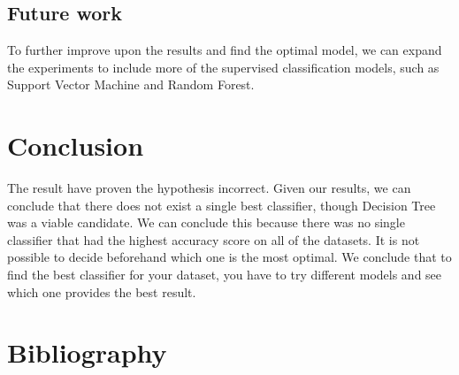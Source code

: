 \documentclass{article}
\begin{document}
\subsection{Future work}
To further improve upon the results and find the optimal model, we can expand the experiments to include more of the supervised classification models, such as Support Vector Machine and Random Forest.

\section{Conclusion}
The result have proven the hypothesis incorrect. Given our results, we can conclude that there does not exist a single best classifier, though Decision Tree was a viable candidate. We can conclude this because there was no single classifier that had the highest accuracy score on all of the datasets. It is not possible to decide beforehand which one is the most optimal. We conclude that to find the best classifier for your dataset, you have to try different models and see which one provides the best result.


\section{Bibliography}
\nocite{*}
\raggedright


 
\end{document}
